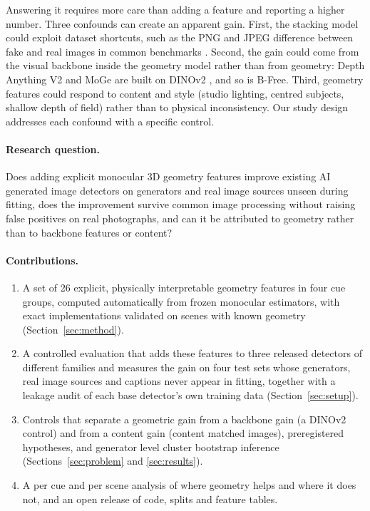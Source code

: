 \documentclass[11pt,a4paper]{article}
\begin{document}
Answering it requires more care than adding a feature and reporting a higher number. Three confounds can create an apparent gain. First, the stacking model could exploit dataset shortcuts, such as the PNG and JPEG difference between fake and real images in common benchmarks \citep{grommelt2024fake}. Second, the gain could come from the visual backbone inside the geometry model rather than from geometry: Depth Anything V2 and MoGe are built on DINOv2 \citep{oquab2024dinov2}, and so is B-Free. Third, geometry features could respond to content and style (studio lighting, centred subjects, shallow depth of field) rather than to physical inconsistency. Our study design addresses each confound with a specific control.

\paragraph{Research question.} Does adding explicit monocular 3D geometry features improve existing AI generated image detectors on generators and real image sources unseen during fitting, does the improvement survive common image processing without raising false positives on real photographs, and can it be attributed to geometry rather than to backbone features or content?

\paragraph{Contributions.}
\begin{enumerate}
\item A set of 26 explicit, physically interpretable geometry features in four cue groups, computed automatically from frozen monocular estimators, with exact implementations validated on scenes with known geometry (Section~\ref{sec:method}).
\item A controlled evaluation that adds these features to three released detectors of different families and measures the gain on four test sets whose generators, real image sources and captions never appear in fitting, together with a leakage audit of each base detector's own training data (Section~\ref{sec:setup}).
\item Controls that separate a geometric gain from a backbone gain (a DINOv2 control) and from a content gain (content matched images), preregistered hypotheses, and generator level cluster bootstrap inference (Sections~\ref{sec:problem} and \ref{sec:results}).
\item A per cue and per scene analysis of where geometry helps and where it does not, and an open release of code, splits and feature tables.
\end{enumerate}
\end{document}
